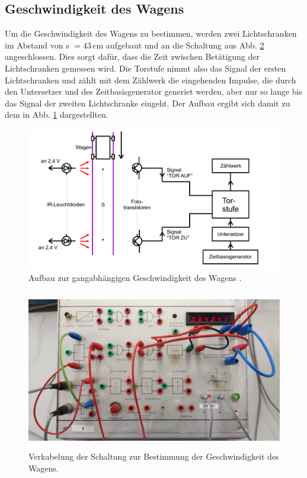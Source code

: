\subsection{Geschwindigkeit des Wagens}
\label{sec:Geschwindigkeit}
Um die Geschwindigkeit des Wagens zu bestimmen, werden zwei Lichtschranken im
Abstand von s $=43\,$cm aufgebaut und an die Schaltung aus Abb.
\ref{fig:Geschwindigkeit-Schaltung} angeschlossen. Dies sorgt dafür,
dass die Zeit zwischen Betätigung der Lichtschranken gemessen wird.
Die Torstufe nimmt also das Signal der ersten Lichtschranken und zählt mit dem Zählwerk
die eingehenden Impulse, die durch den Untersetzer und des Zeitbasisgenerator
generiet werden, aber nur so lange bis das Signal der zweiten Lichtschranke eingeht.
Der Aufbau ergibt sich damit zu dem in Abb. \ref{fig:Geschwindigkeit}
dargestellten.
\begin{figure}
  \centering
  \includegraphics[width = \textwidth]{./Abbildungen/Geschwindigkeit.PNG}
  \caption{Aufbau zur gangabhängigen Geschwindigkeit des Wagens \cite{Anleitung}.}
  \label{fig:Geschwindigkeit}
\end{figure}
\begin{figure}
  \centering
  \includegraphics[height = 7cm]{./Abbildungen/Geschwindigkeit-Schaltung.jpg}
  \caption{Verkabelung der Schaltung zur Bestimmung der Geschwindigkeit des Wagens.}
  \label{fig:Geschwindigkeit-Schaltung}
\end{figure}

